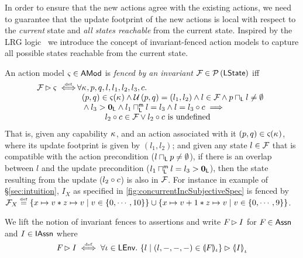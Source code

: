 In order to ensure that the new actions agree with the existing actions, we need to guarantee that the update footprint of the new actions is local with respect to the \emph{current} state and \emph{all states reachable} from the current state. Inspired by the LRG logic~\cite{lrg} we introduce the concept of invariant-fenced action models to capture all possible states reachable from the current state.
%
\begin{definition}
An action model $\amod{} \in \AMods$ is \emph{fenced by an invariant} $\fence{} \in \pset{\LStates}$ iff
%
\[
\hspace*{-0.15cm}
\begin{array}{l l}
	\fence{} \fences \amod{} \iffdef \hspace*{-0.2cm}
	 &\hspace*{-0.2cm} \for{\ca{}, p, q, l, l_1, l_2, l_3, c}\\
	 
	 & 
	 	(p, q) \in \amod{}(\ca{}) 
	 	\land \updateFP{p, q} = (l_1, l_2) \land
	 	l \in \fence{} \land
	 	p \meetL l \not= \emptyset \\
	 	
	 & 
	 	\null\land l_3 > \unitL \land
	 	 l_1 \maxMeetL l = l_3 \land
	 	 l = l_3 \composeL c
	 	 \implies\\
	 	 
	 & \hspace*{1cm} l_2 \composeL c \in \fence{}	 \lor l_2 \composeL c \text{ is undefined}
\end{array}
\]
%
That is, given any capability $\ca{}$, and an action associated with it $(p, q) \in \amod{}(\ca{})$, where its update footprint is given by $(l_1, l_2)$; and given any state $l \in \fence{}$ that is compatible with the action precondition ($l \meetL p \not= \emptyset$), if there is an overlap between $l$ and the update precondition ($l_1 \maxMeetL l = l_3 > \unitL$), then the state resulting from the update ($l_2 \composeL c$) is also in $\fence{}$.
For instance in example of \S\ref{sec:intuition}, $I_X$ as specified in \fig\ref{fig:concurrentIncSubjectiveSpec} is fenced by $\fence{X} \eqdef \left\{\cell{x}{v} * \cell{z}{v} \mid v \in \{0, \cdots, 10\} \right\} \cup \left\{\cell{x}{v+1} * \cell{z}{v} \mid v \in \{0 ,\cdots, 9 \}\right\}$.
% 

We lift the notion of invariant fences to assertions and write $\fenceAss{} \fences I$  for $\fenceAss{} \in \Assertions$ and $I \in \IAssertions$ where
%
\[
	\fenceAss{} \fences I \iffdef \for{\lenv \in \LEnv} \left\{ l \mid (l, -, -, -) \in \intermediateSem[\lenv]{F} \right\} \fences \semI[\lenv]{I}
\]
%
\end{definition}
